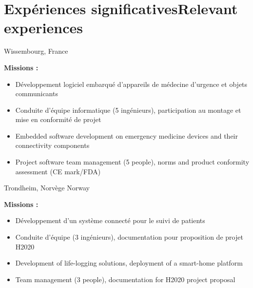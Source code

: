 \section{\ifnativelang Exp\'eriences significatives\else Relevant experiences\fi}

{}{}{Wissembourg, France}{
\textbf{Missions :} 
\begin{itemize}
\ifnativelang
\item D\'eveloppement logiciel embarqu\'e d'appareils de médecine d'urgence et objets communicants
\item Conduite d'\'equipe informatique (5 ing\'enieurs), participation au montage et mise en conformit\'e de projet
\else
\item Embedded software development on emergency medicine devices and their connectivity components
\item Project software team management (5 people),  norms and product conformity assessment (CE mark/FDA)
\fi
\end{itemize}
}

\vspace{\ItemsSpacing}

{}{}{Trondheim, \ifnativelang Norv\`ege \else Norway \fi}{
\textbf{Missions :} 
\begin{itemize}
\ifnativelang
\item D\'eveloppement d'un syst\`eme connect\'e pour le suivi de patients
\item Conduite d'\'equipe (3 ing\'enieurs), documentation pour proposition de projet H2020
\else
\item Development of life-logging solutions, deployment of a smart-home platform
\item Team management (3 people), documentation for H2020 project proposal
\fi
\end{itemize}
}

